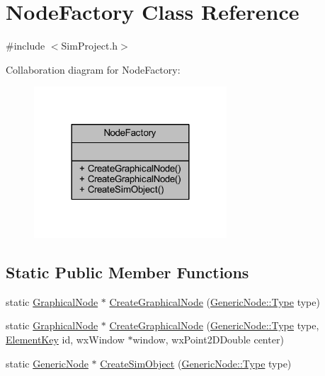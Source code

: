\hypertarget{class_node_factory}{}\section{Node\+Factory Class Reference}
\label{class_node_factory}


{\ttfamily \#include $<$Sim\+Project.\+h$>$}



Collaboration diagram for Node\+Factory\+:
\nopagebreak
\begin{figure}[H]
\begin{center}
\leavevmode
\includegraphics[width=204pt]{class_node_factory__coll__graph}
\end{center}
\end{figure}
\subsection*{Static Public Member Functions}
\begin{DoxyCompactItemize}
\item 
static \hyperlink{class_graphical_node}{Graphical\+Node} $\ast$ \hyperlink{class_node_factory_ad20f428dcd40cb7524d1269c456d1faa}{Create\+Graphical\+Node} (\hyperlink{class_generic_node_a9e7985ab9bbfa1c85091adc0ab71a6b6}{Generic\+Node\+::\+Type} type)
\item 
static \hyperlink{class_graphical_node}{Graphical\+Node} $\ast$ \hyperlink{class_node_factory_af32fcc77826632e78f5e2d44b5174f16}{Create\+Graphical\+Node} (\hyperlink{class_generic_node_a9e7985ab9bbfa1c85091adc0ab71a6b6}{Generic\+Node\+::\+Type} type, \hyperlink{_graphical_element_8h_ade5fd6c85839a416577ff9de1605141e}{Element\+Key} id, wx\+Window $\ast$window, wx\+Point2\+D\+Double center)
\item 
static \hyperlink{class_generic_node}{Generic\+Node} $\ast$ \hyperlink{class_node_factory_a95b5ced21c265b1d028e98499945c341}{Create\+Sim\+Object} (\hyperlink{class_generic_node_a9e7985ab9bbfa1c85091adc0ab71a6b6}{Generic\+Node\+::\+Type} type)
\end{DoxyCompactItemize}


